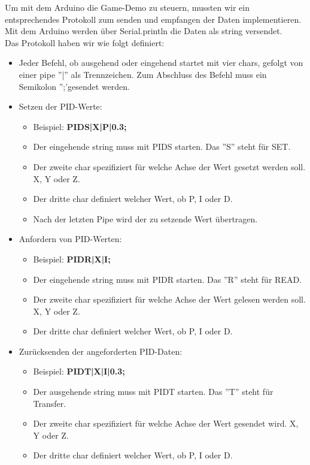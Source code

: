 Um mit dem Arduino die Game-Demo zu steuern, mussten wir ein entsprechendes Protokoll zum senden und empfangen der Daten implementieren. Mit dem Arduino werden über Serial.println die Daten als string versendet.\\

Das Protokoll haben wir wie folgt definiert:

\begin{itemize}
  \item Jeder Befehl, ob ausgehend oder eingehend startet mit vier chars, gefolgt von einer pipe ''|'' als Trennzeichen. Zum Abschluss des Befehl muss ein Semikolon '';'gesendet werden.
  \item Setzen der PID-Werte:
  \begin{itemize}
    \item Beispiel: \textbf{PIDS|X|P|0.3;}
    \item Der eingehende string muss mit PIDS starten. Das ''S'' steht für SET.
    \item Der zweite char spezifiziert für welche Achse der Wert gesetzt werden soll. X, Y oder Z.
    \item Der dritte char definiert welcher Wert, ob P, I oder D.
    \item Nach der letzten Pipe wird der zu setzende Wert übertragen.
  \end{itemize}
  \item  Anfordern von PID-Werten:
  \begin{itemize}
    \item Beispiel: \textbf{PIDR|X|I;}
    \item Der eingehende string muss mit PIDR starten. Das ''R'' steht für READ.
    \item Der zweite char spezifiziert für welche Achse der Wert gelesen werden soll. X, Y oder Z.
    \item Der dritte char definiert welcher Wert, ob P, I oder D.
  \end{itemize}
  \item  Zurücksenden der angeforderten PID-Daten:
  \begin{itemize}
    \item Beispiel: \textbf{PIDT|X|I|0.3;}
    \item Der ausgehende string muss mit PIDT starten. Das ''T'' steht für Transfer.
    \item Der zweite char spezifiziert für welche Achse der Wert gesendet wird. X, Y oder Z.
    \item Der dritte char definiert welcher Wert, ob P, I oder D.

\end{itemize}
\end{itemize}
